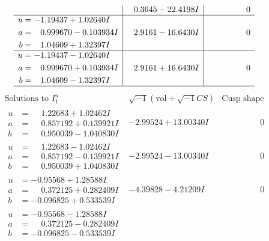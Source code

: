 \documentclass[1p]{elsarticle_modified}
\theoremstyle{definition}
\newcommand{\I}{\sqrt{-1}}
\begin{document}
$$\begin{array}{c|c|c}
 & \phantom{-}0.3645 - 22.4198 I & \phantom{-0.000000 } 0 \\ \hline\begin{aligned}
u &= -1.19437 + 1.02640 I \\
a &= \phantom{-}0.999670 - 0.103934 I \\
b &= \phantom{-}1.04609 + 1.32397 I\end{aligned}
 & \phantom{-}2.9161 - 16.6430 I & \phantom{-0.000000 } 0 \\ \hline\begin{aligned}
u &= -1.19437 - 1.02640 I \\
a &= \phantom{-}0.999670 + 0.103934 I \\
b &= \phantom{-}1.04609 - 1.32397 I\end{aligned}
 & \phantom{-}2.9161 + 16.6430 I & \phantom{-0.000000 } 0\\
 \hline 
 \end{array}$$\newpage$$\begin{array}{c|c|c}  
\text{Solutions to }I^u_{1}& \I (\text{vol} + \sqrt{-1}CS) & \text{Cusp shape}\\
 \hline 
\begin{aligned}
u &= \phantom{-}1.22683 + 1.02462 I \\
a &= \phantom{-}0.857192 + 0.139921 I \\
b &= \phantom{-}0.950039 - 1.040830 I\end{aligned}
 & -2.99524 + 13.00340 I & \phantom{-0.000000 } 0 \\ \hline\begin{aligned}
u &= \phantom{-}1.22683 - 1.02462 I \\
a &= \phantom{-}0.857192 - 0.139921 I \\
b &= \phantom{-}0.950039 + 1.040830 I\end{aligned}
 & -2.99524 - 13.00340 I & \phantom{-0.000000 } 0 \\ \hline\begin{aligned}
u &= -0.95568 + 1.28588 I \\
a &= \phantom{-}0.372125 + 0.282409 I \\
b &= -0.096825 + 0.533539 I\end{aligned}
 & -4.39828 - 4.21209 I & \phantom{-0.000000 } 0 \\ \hline\begin{aligned}
u &= -0.95568 - 1.28588 I \\
a &= \phantom{-}0.372125 - 0.282409 I \\
b &= -0.096825 - 0.533539 I\end{aligned}

\end{array}$$
\end{document}
